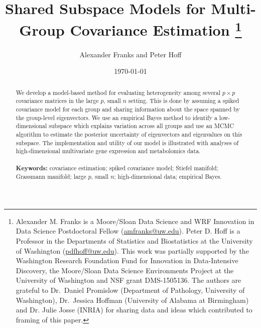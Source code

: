 \documentclass[12pt]{article}
\begin{document}
\title{Shared Subspace Models for Multi-Group Covariance Estimation
%
  \protect\thanks{Alexander M. Franks is a Moore/Sloan Data Science
    and WRF Innovation in Data Science Postdoctoral Fellow
    (\href{mailto:amfranks@uw.edu}{amfranks@uw.edu}).  Peter D. Hoff
    is a Professor in the Departments of Statistics and Biostatistics
    at the University of Washington
    (\href{mailto:pdhoff@uw.edu}{pdfhoff@uw.edu}).
%
This work was partially supported 
 by the Washington Research Foundation Fund for Innovation in
 Data-Intensive Discovery, the Moore/Sloan Data Science Environments
 Project at the University of Washington and NSF grant DMS-1505136.
%
 The authors are grateful to Dr.\ Daniel Promislow (Department of
 Pathology, University of Washington), Dr.\ Jessica Hoffman
 (University of Alabama at Birmingham) and Dr. Julie Josse (INRIA)
 for sharing data and ideas which contributed to framing of this
 paper.}}  \author{Alexander Franks and Peter Hoff} \date{\today}
\maketitle 
\begin{abstract}


  We develop a model-based method for evaluating heterogeneity among
  several $p\times p$ covariance matrices in the large $p$, small $n$ setting.
  This is done by assuming a spiked covariance model for each group
  and sharing information about the space spanned by the group-level
  eigenvectors.  We use an empirical Bayes method to identify a low-dimensional
  subspace which explains variation across all groups and use an MCMC
  algorithm to estimate the posterior uncertainty of eigenvectors and
  eigenvalues on this subspace.  The implementation and utility of our
  model is illustrated with analyses of high-dimensional multivariate
  gene expression and metabolomics data.
\\
\\
\noindent\textbf{Keywords:} covariance estimation; spiked covariance
model; Stiefel manifold; Grassmann manifold; large $p$, small $n$;
high-dimensional data; empirical Bayes.
\vfill
\end{abstract}
\end{document}
